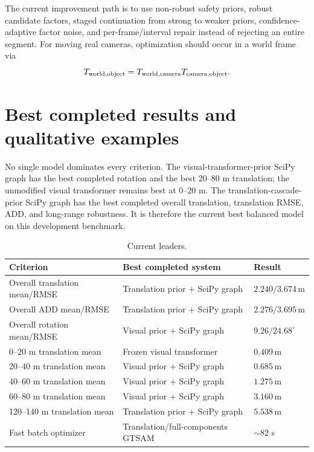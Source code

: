 \documentclass[11pt]{article}
\newcommand{\unitm}{\,\mathrm{m}}
\newcommand{\unitdeg}{^{\circ}}
\begin{document}
The current improvement path is to use non-robust safety priors, robust candidate factors, staged continuation from strong to weaker priors, confidence-adaptive factor noise, and per-frame/interval repair instead of rejecting an entire segment.  For moving real cameras, optimization should occur in a world frame via
\begin{equation}
T_{\rm world,object}=T_{\rm world,camera}T_{\rm camera,object}.
\end{equation}

\section{Best completed results and qualitative examples}

No single model dominates every criterion.  The visual-transformer-prior SciPy graph has the best completed rotation and the best 20--80 m translation; the unmodified visual transformer remains best at 0--20 m.  The translation-cascade-prior SciPy graph has the best completed overall translation, translation RMSE, ADD, and long-range robustness.  It is therefore the current best balanced model on this development benchmark.

\begin{table}[H]
\centering
\caption{Current leaders.}
\begin{tabular}{lll}
\toprule
Criterion & Best completed system & Result\\
\midrule
Overall translation mean/RMSE & Translation prior + SciPy graph & $2.240/3.674\unitm$\\
Overall ADD mean/RMSE & Translation prior + SciPy graph & $2.276/3.695\unitm$\\
Overall rotation mean/RMSE & Visual prior + SciPy graph & $9.26/24.68\unitdeg$\\
0--20 m translation mean & Frozen visual transformer & $0.409\unitm$\\
20--40 m translation mean & Visual prior + SciPy graph & $0.685\unitm$\\
40--60 m translation mean & Visual prior + SciPy graph & $1.275\unitm$\\
60--80 m translation mean & Visual prior + SciPy graph & $3.160\unitm$\\
120--140 m translation mean & Translation prior + SciPy graph & $5.538\unitm$\\
Fast batch optimizer & Translation/full-components GTSAM & $\sim82$ s\\
\bottomrule
\end{tabular}
\end{table}
\end{document}

